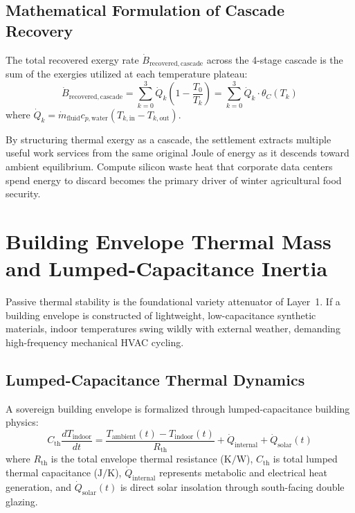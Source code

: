 \subsection{Mathematical Formulation of Cascade Recovery}
The total recovered exergy rate $\dot{B}_{\mathrm{recovered, cascade}}$ across the 4-stage cascade is the sum of the exergies utilized at each temperature plateau:
\begin{equation}
\dot{B}_{\mathrm{recovered, cascade}} = \sum_{k=0}^{3} \dot{Q}_k \left( 1 - \frac{T_0}{T_k} \right) = \sum_{k=0}^{3} \dot{Q}_k \cdot \theta_C(T_k)
\label{eq:cascade_exergy_sum}
\end{equation}
where $\dot{Q}_k = \dot{m}_{\mathrm{fluid}} c_{p,\mathrm{water}} (T_{k,\mathrm{in}} - T_{k,\mathrm{out}})$.

By structuring thermal exergy as a cascade, the settlement extracts multiple useful work services from the same original Joule of energy as it descends toward ambient equilibrium. Compute silicon waste heat that corporate data centers spend energy to discard becomes the primary driver of winter agricultural food security.

\section{Building Envelope Thermal Mass and Lumped-Capacitance Inertia}
\label{sec:th_envelope}

Passive thermal stability is the foundational variety attenuator of Layer~1. If a building envelope is constructed of lightweight, low-capacitance synthetic materials, indoor temperatures swing wildly with external weather, demanding high-frequency mechanical HVAC cycling.

\subsection{Lumped-Capacitance Thermal Dynamics}
A sovereign building envelope is formalized through lumped-capacitance building physics:
\begin{equation}
C_{\mathrm{th}} \frac{dT_{\mathrm{indoor}}}{dt} = \frac{T_{\mathrm{ambient}}(t) - T_{\mathrm{indoor}}(t)}{R_{\mathrm{th}}} + \dot{Q}_{\mathrm{internal}} + \dot{Q}_{\mathrm{solar}}(t)
\label{eq:lumped_capacitance_ode}
\end{equation}
where $R_{\mathrm{th}}$ is the total envelope thermal resistance ($\mathrm{K/W}$), $C_{\mathrm{th}}$ is total lumped thermal capacitance ($\mathrm{J/K}$), $\dot{Q}_{\mathrm{internal}}$ represents metabolic and electrical heat generation, and $\dot{Q}_{\mathrm{solar}}(t)$ is direct solar insolation through south-facing double glazing.

